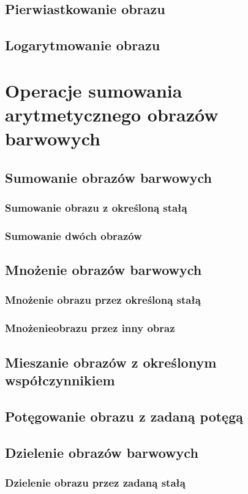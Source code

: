 \documentclass[a4paper,12pt, titlepage]{report}
\begin{document}
\section{Pierwiastkowanie obrazu}
\section{Logarytmowanie obrazu}

\chapter{Operacje sumowania arytmetycznego obrazów barwowych}

\section{Sumowanie obrazów barwowych}
\subsection{Sumowanie obrazu z określoną stałą}
\subsection{Sumowanie dwóch obrazów}
\section{Mnożenie obrazów barwowych}
\subsection{Mnożenie obrazu przez określoną stałą}
\subsection{Mnożenieobrazu przez inny obraz}
\section{Mieszanie obrazów z określonym współczynnikiem}
\section{Potęgowanie obrazu z zadaną potęgą}
\section{Dzielenie obrazów barwowych}
\subsection{Dzielenie obrazu przez zadaną stałą}
\end{document}
